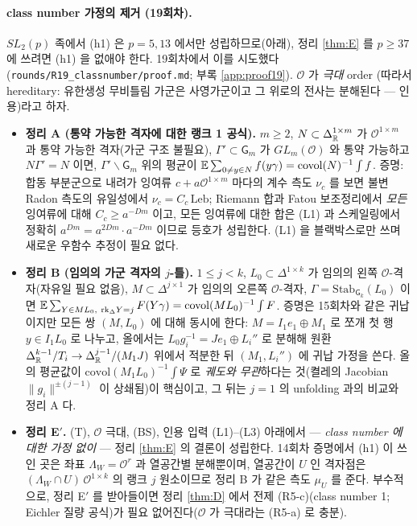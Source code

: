 \paragraph{class number 가정의 제거 (19회차).} $SL_2(p)$ 족에서 (h1) 은 $p=5,13$ 에서만 성립하므로(아래), 정리 \ref{thm:E} 를 $p\ge37$ 에 쓰려면 (h1) 을 없애야 한다. 19회차에서 이를 시도했다(\texttt{rounds/R19\_classnumber/proof.md}; 부록 \ref{app:proof19}). $\mathcal O$ 가 \emph{극대} order (따라서 hereditary: 유한생성 무비틀림 가군은 사영가군이고 그 위로의 전사는 분해된다 --- 인용)라고 하자.
\begin{itemize}
\item \textbf{정리 A (통약 가능한 격자에 대한 랭크 1 공식).} $m\ge2$, $N\subset\Delta_{\mathbb{R}}^{1\times m}$ 가 $\mathcal O^{1\times m}$ 과 통약 가능한 격자(가군 구조 불필요), $\Gamma'\subset\mathsf G_m$ 가 $GL_m(\mathcal O)$ 와 통약 가능하고 $N\Gamma'=N$ 이면, $\Gamma'\backslash\mathsf G_m$ 위의 평균이 $\mathbb{E}\sum_{0\ne y\in N}f(y\gamma)=\mathrm{covol}(N)^{-1}\int f$. 증명: 합동 부분군으로 내려가 잉여류 $c+a\mathcal O^{1\times m}$ 마다의 계수 측도 $\nu_c$ 를 보면 불변 Radon 측도의 유일성에서 $\nu_c=C_c\,\mathrm{Leb}$; Riemann 합과 Fatou 보조정리에서 \emph{모든} 잉여류에 대해 $C_c\ge a^{-Dm}$ 이고, 모든 잉여류에 대한 합은 (L1) 과 스케일링에서 정확히 $a^{Dm}=a^{2Dm}\cdot a^{-Dm}$ 이므로 등호가 성립한다. (L1) 을 블랙박스로만 쓰며 새로운 우함수 추정이 필요 없다.
\item \textbf{정리 B (임의의 가군 격자의 $j$-틀).} $1\le j<k$, $L_0\subset\Delta^{1\times k}$ 가 임의의 왼쪽 $\mathcal O$-격자(자유일 필요 없음), $M\subset\Delta^{j\times1}$ 가 임의의 오른쪽 $\mathcal O$-격자, $\Gamma=\mathrm{Stab}_{\mathsf G_k}(L_0)$ 이면 $\mathbb{E}\sum_{Y\in ML_0,\ \mathrm{rk}_\Delta Y=j}F(Y\gamma)=\mathrm{covol}(ML_0)^{-1}\int F$. 증명은 15회차와 같은 귀납이지만 모든 쌍 $(M,L_0)$ 에 대해 동시에 한다: $M=I_1e_1\oplus M_1$ 로 쪼개 첫 행 $y\in I_1L_0$ 로 나누고, 올에서는 $L_0g_i^{-1}=Je_1\oplus L_i''$ 로 분해해 원환 $\Delta_{\mathbb{R}}^{k-1}/T_i\to\Delta_{\mathbb{R}}^{j-1}/(M_1J)$ 위에서 적분한 뒤 $(M_1,L_i'')$ 에 귀납 가정을 쓴다. 올의 평균값이 $\mathrm{covol}(M_1L_0)^{-1}\int\Psi$ 로 \emph{궤도와 무관}하다는 것(켤레의 Jacobian $\|g_i\|^{\pm(j-1)}$ 이 상쇄됨)이 핵심이고, 그 뒤는 $j=1$ 의 unfolding 과의 비교와 정리 A 다.
\item \textbf{정리 E$'$.} (T), $\mathcal O$ 극대, (BS), 인용 입력 (L1)--(L3) 아래에서 --- \emph{class number 에 대한 가정 없이} --- 정리 \ref{thm:E} 의 결론이 성립한다. 14회차 증명에서 (h1) 이 쓰인 곳은 좌표 $\Lambda_W=\mathcal O^r$ 과 열공간별 분해뿐이며, 열공간이 $U$ 인 격자점은 $(\Lambda_W\cap U)\,\mathcal O^{1\times k}$ 의 랭크 $j$ 원소이므로 정리 B 가 같은 측도 $\mu_U$ 를 준다. 부수적으로, 정리 E$'$ 를 받아들이면 정리 \ref{thm:D} 에서 전제 (R5-c)(class number 1; Eichler 질량 공식)가 필요 없어진다($\mathcal O$ 가 극대라는 (R5-a) 로 충분).
\end{itemize}
